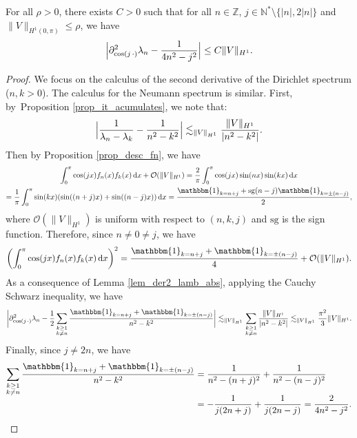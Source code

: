 \begin{lemma}
\label{lem_est_d2} For all $\rho >0$, there exists $C>0$ such that for all $n\in \mathbb{Z}$, $j\in \mathbb{N}^* \setminus \{ |n|,2|n|\}$ and $\|V\|_{H^1(0,\pi)} \leq \rho$, we have
\[
\Bigl| \partial^2_{\cos(j \,\cdot)}\lambda_n - \frac1{4n^2 -j^2} \Bigr| \leq C \|V\|_{H^1}.
\]

\end{lemma}
\begin{proof} We focus on the calculus of the second derivative of the Dirichlet spectrum (\ie $n,k>0$). The calculus for the Neumann spectrum is similar. First, by~Proposition \ref{prop_it_acumulates}, we note that:
\[
\Bigl| \frac1{\lambda_n - \lambda_k} - \frac1{n^2 - k^2} \Bigr| \lesssim_{\|V\|_{H^1}} \frac{\|V\|_{H^1}}{|n^2-k^2|}.
\]
Then by Proposition \ref{prop_desc_fn}, we have
\begin{multline*}
\int_0^\pi \cos(j x) f_n(x) f_k(x) \, \mathrm{d}x + \mathcal{O}(\| V\|_{H^1}) = \frac2\pi \int_0^\pi \cos(j x) \sin(n x) \sin(k x) \, \mathrm{d}x \\
= \frac1\pi \int_0^\pi \sin(kx) (\sin((n+j)x)+\sin((n-j)x)) \, \mathrm{d}x = \frac{\mathbbm{1}_{k=n+j} + \mathrm{sg}(n-j) \mathbbm{1}_{k=\pm (n-j)} }2,
\end{multline*}
where $\mathcal{O}(\| V\|_{H^1})$ is uniform with respect to $(n,k,j)$ and $\mathrm{sg}$ is the sign function. Therefore, since $n\neq 0\neq j$, we have
\[
\left(\int_0^\pi \cos(j x) f_n(x) f_k(x) \, \mathrm{d}x \right)^2 = \frac{\mathbbm{1}_{k=n+j} + \mathbbm{1}_{k=\pm (n-j)} }4 + \mathcal{O}(\| V\|_{H^1}).
\]
As a consequence of Lemma \ref{lem_der2_lamb_abs}, applying the Cauchy Schwarz inequality, we have
\[
\biggl| \partial^2_{\cos(j \,\cdot)}\lambda_n - \frac12\sum_{\substack{k \geq 1\\ k\neq n}} \frac{\mathbbm{1}_{k=n+j} + \mathbbm{1}_{k=\pm (n-j)}}{ n^2-k^2} \biggr|\lesssim_{\|V\|_{H^1}} \sum_{\substack{k \geq 1\\ k\neq n}} \frac{\|V\|_{H^1}}{|n^2-k^2|} \lesssim_{\|V\|_{H^1}} \frac{\pi^2}3 \|V\|_{H^1}.
\]
Finally, since $j\neq 2n$, we have
\begin{align*}
\sum_{\substack{k \geq 1\\ k\neq n}} \frac{\mathbbm{1}_{k=n+j} + \mathbbm{1}_{k=\pm (n-j)}}{ n^2-k^2} &= \frac{1}{n^2 - (n+j)^2} + \frac{1}{n^2 - (n-j)^2}\\[-5pt]
&= -\frac1{j(2n+j)} + \frac1{j(2n-j)} = \frac2{4n^2-j^2}.\qedhere
\end{align*}
\end{proof}

